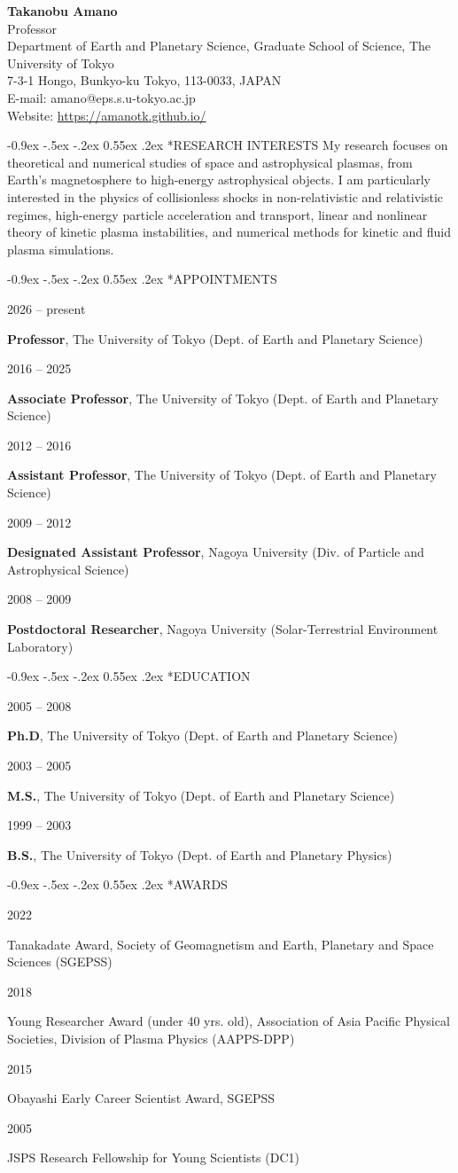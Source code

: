 \documentclass[a4paper,fontsize=10pt]{scrartcl}
\makeatletter
\renewcommand{\section}{\@startsection{section}{1}{\z@}%
  {-0.9ex \@plus -.5ex \@minus -.2ex}%
  {0.55ex \@plus .2ex}%
  {\normalfont\large\bfseries}}
\newcommand{\NewPart}[1]{\section*{\uppercase{#1}}}
\newcommand{\Entry}[2]{%
\noindent\parbox[t]{9em}{#1}\hspace{0.5em}\parbox[t]{\dimexpr\textwidth-9.5em\relax}{#2}\par\vspace{0.22em}}
\makeatother
\begin{document}
\begin{flushright}
	{\Huge \textbf{Takanobu Amano}}\\[0.3em]
	{\large Professor}\\
	Department of Earth and Planetary Science, Graduate School of Science, The University of Tokyo\\
	7-3-1 Hongo, Bunkyo-ku Tokyo, 113-0033, JAPAN\\
	E-mail: amano@eps.s.u-tokyo.ac.jp\\
	Website: \url{https://amanotk.github.io/}
\end{flushright}

\NewPart{Research Interests}
My research focuses on theoretical and numerical studies of space and astrophysical plasmas, from Earth's magnetosphere to high-energy astrophysical objects. I am particularly interested in the physics of collisionless shocks in non-relativistic and relativistic regimes, high-energy particle acceleration and transport, linear and nonlinear theory of kinetic plasma instabilities, and numerical methods for kinetic and fluid plasma simulations.

\NewPart{Appointments}
\Entry{2026 -- present}{\textbf{Professor}, The University of Tokyo (Dept. of Earth and Planetary Science)}
\Entry{2016 -- 2025}{\textbf{Associate Professor}, The University of Tokyo (Dept. of Earth and Planetary Science)}
\Entry{2012 -- 2016}{\textbf{Assistant Professor}, The University of Tokyo (Dept. of Earth and Planetary Science)}
\Entry{2009 -- 2012}{\textbf{Designated Assistant Professor}, Nagoya University (Div. of Particle and Astrophysical Science)}
\Entry{2008 -- 2009}{\textbf{Postdoctoral Researcher}, Nagoya University (Solar-Terrestrial Environment Laboratory)}

\NewPart{Education}
\Entry{2005 -- 2008}{\textbf{Ph.D}, The University of Tokyo (Dept. of Earth and Planetary Science)}
\Entry{2003 -- 2005}{\textbf{M.S.}, The University of Tokyo (Dept. of Earth and Planetary Science)}
\Entry{1999 -- 2003}{\textbf{B.S.}, The University of Tokyo (Dept. of Earth and Planetary Physics)}

\NewPart{Awards}
\Entry{2022}{Tanakadate Award, Society of Geomagnetism and Earth, Planetary and Space Sciences (SGEPSS)}
\Entry{2018}{Young Researcher Award (under 40 yrs. old), Association of Asia Pacific Physical Societies, Division of Plasma Physics (AAPPS-DPP)}
\Entry{2015}{Obayashi Early Career Scientist Award, SGEPSS}
\Entry{2005}{JSPS Research Fellowship for Young Scientists (DC1)}
\end{document}
